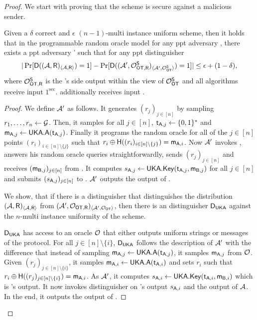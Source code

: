 \begin{proof}
We start with proving that the scheme is secure against a malicious sender. 
\begin{claim}\label{claim:malsender}
Given a $\delta$ correct and $\epsilon$ $(n-1)$-multi instance uniform \UKA scheme, then it holds that in the programmable random oracle model for any ppt adversary \Adv, there exists a ppt adversary \Adv' such that for any ppt distinguisher \D
$$
|\Pr[\mathsf D((\mathcal{A},\mathsf{R})_{\langle \mathcal{A}, \mathsf{R}\rangle})=1] -\Pr[\mathsf D( (\mathcal{A}', \mathcal{O}_{\mathsf{OT}, \mathsf{R}}^\mathsf{S})_{\langle \mathcal{A}', \mathcal{O}_{\mathsf{OT}}^\mathsf{S}\rangle})=1]|\leq \epsilon+(1-\delta),
$$
where $\mathcal{O}_{\mathsf{OT}, \mathsf{R}}^\mathsf{S}$ is the \rec's side output within the view of $\mathcal{O}_{\mathsf{OT}}^\mathsf{S}$ and all algorithms receive input $1^\sec$. \rec additionally receives input \set.
\end{claim}

\begin{proof}
We define $\mathcal{A}'$ as follows. 
It generates $(r_j)_{j\in[n]}$ by sampling $r_1,\dots, r_n\leftarrow \mathcal{G}$. Then, it samples for all $j\in[n]$, $\mathsf{t}_{\mathsf{A},j}\leftarrow\{0,1\}^*$ and $\mathsf{m}_{\mathsf{A},j}\leftarrow\mathsf{UKA}.\mathsf{A}(\mathsf{t}_{\mathsf{A},j})$. Finally it programs the random oracle for all of the $j\in[n]$ points $(r_i)_{i\in[n]\setminus \{j\}}$ such that $r_i\oplus\mathsf{H}((r_i)_{i\in[n]\setminus \{j\}})=\mathsf{m}_{\mathsf{A},i}$. Now $\mathcal{A}'$ invokes \Adv, answers his random oracle queries straightforwardly, sends $(r_j)_{j\in[n]}$ and receives $(\mathsf{m}_{\mathsf{B},j})_{j\in[n]}$ from \Adv. It computes $s_{\mathsf{A},j}\leftarrow\mathsf{UKA}.\mathsf{Key}(\mathsf{t}_{\mathsf{A},j},\mathsf{m}_{\mathsf{B},j})$ for all $j\in[n]$ and submits $(s_{\mathsf{A},j})_{j\in [n]}$ to \OOT. $\mathcal{A}'$ outputs the output of \Adv.

We show, that if there is a distinguisher \D that distinguishes the distribution $(\mathcal{A},\mathsf{R})_{\langle \mathcal{A}, \mathsf{R}\rangle}$ from $(\mathcal{A}',\mathcal{O}_{\mathsf{OT}, \mathsf{R}})_{\langle \mathcal{A}', \mathcal{O}_{\mathsf{OT}}\rangle}$, then there is an distinguisher $\mathsf D_{\mathsf{UKA}}$ against the $n$-multi instance uniformity of the \UKA scheme. 

$\mathsf D_{\mathsf{UKA}}$ has access to an oracle $\mathcal{O}$ that either outputs uniform strings or messages of the \UKA protocol. For all $j\in[n]\setminus\{i\}$, $\mathsf D_{\mathsf{UKA}}$ follows the description of $\mathcal{A}'$ with the difference that instead of sampling  $\mathsf{m}_{\mathsf{A},j}\leftarrow\mathsf{UKA}.\mathsf{A}(\mathsf{t}_{\mathsf{A},j})$, it samples $\mathsf{m}_{\mathsf{A},j}$ from $\mathcal{O}$. Given $(r_j)_{j\in[n]\setminus\{i\}}$, it samples $\mathsf{m}_{\mathsf{A},i}\leftarrow\mathsf{UKA}.\mathsf{A}(\mathsf{t}_{\mathsf{A},i})$ and sets $r_i$ such that $r_i\oplus\mathsf{H}((r_j)_{j\in[n]\setminus \{i\}})=\mathsf{m}_{\mathsf{A},i}$. As $\mathcal{A}'$, it computes $s_{\mathsf{A},i}\leftarrow\mathsf{UKA}.\mathsf{Key}(\mathsf{t}_{\mathsf{A},i},\mathsf{m}_{\mathsf{B},i})$ which is \rec's output. It now invokes distinguisher \D on \rec's output $s_{\mathsf{A},i}$ and the output of $\mathcal{A}$. In the end, it outputs the output of \D.



\end{proof}
\end{proof}
